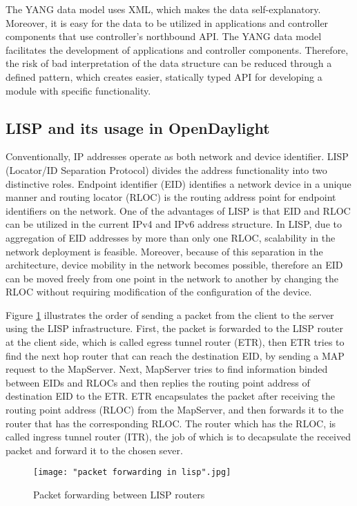 The YANG data model uses XML, which makes the data self-explanatory. Moreover, it is easy for the data to be utilized in applications and controller components that use controller’s northbound API. The YANG data model facilitates the development of applications and controller components. Therefore, the risk of bad interpretation of the data structure can be reduced through a defined pattern, which creates easier, statically typed API for developing a module with specific functionality. 

\subsection{LISP and its usage in OpenDaylight}

Conventionally, IP addresses operate as both network and device identifier. LISP (Locator/ID Separation Protocol) divides the address functionality into two distinctive roles. Endpoint identifier (EID) identifies a network device in a unique manner and routing locator (RLOC) is the routing address point for endpoint identifiers on the network. One of the advantages of LISP is that EID and RLOC can be utilized in the current IPv4 and IPv6 address structure. In LISP, due to aggregation of EID addresses by more than only one RLOC, scalability in the network deployment is feasible. Moreover, because of this separation in the architecture, device mobility in the network becomes possible, therefore an EID can be moved freely from one point in the network to another by changing the RLOC without requiring modification of the configuration of the device. \cite{OKH14}

Figure \ref{fig:LispPacketForwarding} illustrates the order of sending a packet from the client to the server using the LISP infrastructure. First, the packet is forwarded to the LISP router at the client side, which is called egress tunnel router (ETR), then ETR tries to find the next hop router that can reach the destination EID, by sending a MAP request to the MapServer. Next, MapServer tries to find information binded between EIDs and RLOCs and then replies the routing point address of destination EID to the ETR. ETR encapsulates the packet after receiving the routing point address (RLOC) from the MapServer, and then forwards it to the router that has the corresponding RLOC. The router which has the RLOC, is called ingress tunnel router (ITR), the job of which is to decapsulate the received packet and forward it to the chosen sever. 


\begin{figure}[h!t]
\centering
{}
\texttt{[image: "packet forwarding in lisp".jpg]}
\caption{Packet forwarding between LISP routers \cite{OKH14}}
\label{fig:LispPacketForwarding}
\end{figure}

